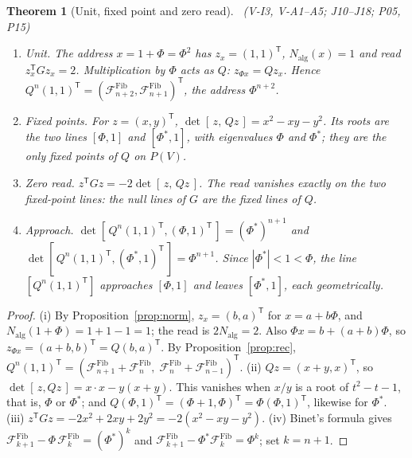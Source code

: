 \documentclass[11pt,a4paper]{article}
\newcommand{\tp}{^{\mathsf T}}
\newcommand{\Nalg}{N_{\mathrm{alg}}}\newcommand{\Fac}{\mathrm{Fac}_G}
\theoremstyle{plain}
\newtheorem{thm}{Theorem}[section]
\theoremstyle{definition}
\theoremstyle{remark}
\begin{document}
\begin{thm}[Unit, fixed point and zero read]\Sder\ \textit{(V-I3, V-A1--A5; J10--J18; P05, P15)}\label{thm:fixed}
\begin{enumerate}[label=(\roman*),nosep]
\item \emph{Unit.} The address $x=1+\Phi=\Phi^2$ has $z_x=(1,1)\tp$, $\Nalg(x)=1$ and read $z_x\tp Gz_x=2$. Multiplication by $\Phi$ acts as $Q$: $z_{\Phi x}=Qz_x$. Hence $Q^n(1,1)\tp=(\mathcal F^{\mathrm{Fib}}_{n+2},\mathcal F^{\mathrm{Fib}}_{n+1})\tp$, the address $\Phi^{n+2}$.
\item \emph{Fixed points.} For $z=(x,y)\tp$, $\det[\,z,\,Qz\,]=x^2-xy-y^2$. Its roots are the two lines $[\Phi,1]$ and $[\Phi^{\ast},1]$, with eigenvalues $\Phi$ and $\Phi^{\ast}$; they are the only fixed points of $Q$ on $P(V)$.
\item \emph{Zero read.} $z\tp Gz=-2\det[\,z,\,Qz\,]$. The read vanishes exactly on the two fixed-point lines: the null lines of $G$ are the fixed lines of $Q$.
\item \emph{Approach.} $\det[\,Q^n(1,1)\tp,(\Phi,1)\tp\,]=(\Phi^{\ast})^{n+1}$ and $\det[\,Q^n(1,1)\tp,(\Phi^{\ast},1)\tp\,]=\Phi^{n+1}$. Since $|\Phi^{\ast}|<1<\Phi$, the line $[Q^n(1,1)\tp]$ approaches $[\Phi,1]$ and leaves $[\Phi^{\ast},1]$, each geometrically.
\end{enumerate}
\end{thm}
\begin{proof}
(i) By Proposition~\ref{prop:norm}, $z_x=(b,a)\tp$ for $x=a+b\Phi$, and $\Nalg(1+\Phi)=1+1-1=1$; the read is $2\Nalg=2$. Also $\Phi x=b+(a+b)\Phi$, so $z_{\Phi x}=(a+b,b)\tp=Q(b,a)\tp$. By Proposition~\ref{prop:rec}, $Q^n(1,1)\tp=(\mathcal F^{\mathrm{Fib}}_{n+1}+\mathcal F^{\mathrm{Fib}}_n,\;\mathcal F^{\mathrm{Fib}}_n+\mathcal F^{\mathrm{Fib}}_{n-1})\tp$. (ii) $Qz=(x+y,x)\tp$, so $\det[\,z,Qz\,]=x\cdot x-y(x+y)$. This vanishes when $x/y$ is a root of $t^2-t-1$, that is, $\Phi$ or $\Phi^{\ast}$; and $Q(\Phi,1)\tp=(\Phi+1,\Phi)\tp=\Phi(\Phi,1)\tp$, likewise for $\Phi^{\ast}$. (iii) $z\tp Gz=-2x^2+2xy+2y^2=-2(x^2-xy-y^2)$. (iv) Binet's formula gives $\mathcal F^{\mathrm{Fib}}_{k+1}-\Phi\,\mathcal F^{\mathrm{Fib}}_k=(\Phi^{\ast})^k$ and $\mathcal F^{\mathrm{Fib}}_{k+1}-\Phi^{\ast}\mathcal F^{\mathrm{Fib}}_k=\Phi^k$; set $k=n+1$.
\end{proof}
\end{document}
